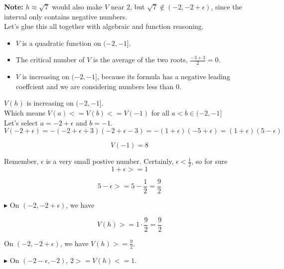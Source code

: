 \documentclass{ximera}
\begin{document}
\begin{explanation}
\begin{itemize}
\textbf{Note:} $h \approx \sqrt{7}$ would also make $V$ near $2$, but $\sqrt{7} \notin (-2, -2 + \epsilon)$, since the interval only contains negative numbers.\\

Let's glue this all together with algebraic and function reasoning. \\





\begin{itemize}
  \item $V$ is a quadratic function on $(-2, -1]$.
  \item The critical number of $V$ is the average of the two roots, $\frac{-3+3}{2} = 0$.
  \item $V$ is increasing on $(-2, -1]$, because its formula has a negative leading coeffcient and we are considering numbers less than $0$.
\end{itemize}

$V(h)$ is increasing on $(-2, -1]$. \\
Which means $V(a) <= V(b) <= V(-1)$ for all $a < b \in (-2, -1]$ \\

Let's select $a = -2 + \epsilon$ and $b = -1$. \\

\[
V(-2 + \epsilon) = -(-2 + \epsilon + 3) (-2 + \epsilon - 3) = -(1 + \epsilon) (-5 + \epsilon) = (1 + \epsilon) (5 - \epsilon)
\]

\[
V(-1) = 8
\]


Remember, $\epsilon$ is a very small postive number.  Certainly, $\epsilon < \frac{1}{2}$, so for sure  \\


\[
1 + \epsilon >= 1
\]

\[
5 -  \epsilon >= 5 -  \frac{1}{2} = \frac{9}{2}
\]




\textbf{\textcolor{blue!55!black}{$\blacktriangleright$}} On $(-2, -2 + \epsilon)$, we have


\[
V(h) >= 1 \cdot \frac{9}{2} = \frac{9}{2}
\]



On $(-2, -2 + \epsilon)$, we have $V(h) >=  \frac{9}{2}$.




\end{itemize}



\textbf{\textcolor{red!90!darkgray}{$\blacktriangleright$}} On $(-2 - \epsilon, -2)$, $2 >= V(h) <= 1$. \\


\end{explanation}
\end{document}
